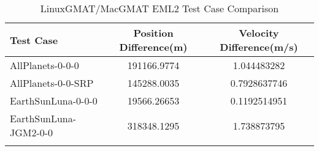 \begin{table}[htbp!]
\centering
\caption{ LinuxGMAT/MacGMAT EML2 Test Case Comparison}
      \begin{tabular}{lcc}
      \hline\hline
          Test Case & Position Difference(m) & Velocity Difference(m/s) \\
         \hline
         AllPlanets-0-0-0 & 191166.9774 & 1.044483282 \\
         AllPlanets-0-0-SRP & 145288.0035 & 0.7928637746 \\
         EarthSunLuna-0-0-0 & 19566.26653 & 0.1192514951 \\
         EarthSunLuna-JGM2-0-0 & 318348.1295 & 1.738873795 \\
      \hline\hline
      \label{Table: EML2 LinuxGMAT-MacGMAT Table} 
\end{tabular}
\end{table}
